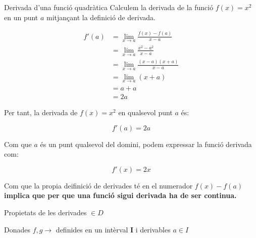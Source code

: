 \documentclass[12pt]{article}
\begin{document}
\begin{examplebox}{Derivada d'una funció quadràtica}
    Calculem la derivada de la funció $f(x)=x^2$ en un punt $a$ mitjançant la definició de derivada.

    \begin{align*}
        f'(a) &= \lim_{x\rightarrow a}\frac{f(x)-f(a)}{x-a}\\[6pt]
        &= \lim_{x\rightarrow a}\frac{x^2-a^2}{x-a}\\[6pt]
        &= \lim_{x\rightarrow a}\frac{(x-a)(x+a)}{x-a}\\[6pt]
        &= \lim_{x\rightarrow a}(x+a)\\[6pt]
        &= a+a\\[6pt]
        &= 2a
    \end{align*}

    Per tant, la derivada de $f(x)=x^2$ en qualsevol punt $a$ és:

    \[\boxed{f'(a)=2a}\]

    Com que $a$ és un punt qualsevol del domini, podem expressar la funció derivada com:

    \[\boxed{f'(x)=2x}\]
\end{examplebox}

Com que la propia deifinició de derivades té en el numerador $f(x) - f(a)$ \textbf{implica que per que una funció sigui derivada ha de ser continua.}

Propietats de les derivades $\in D$

Donades $f,g \rightarrow$ definides en un intèrval \textbf{I} i derivables $a \in I$
\end{document}
